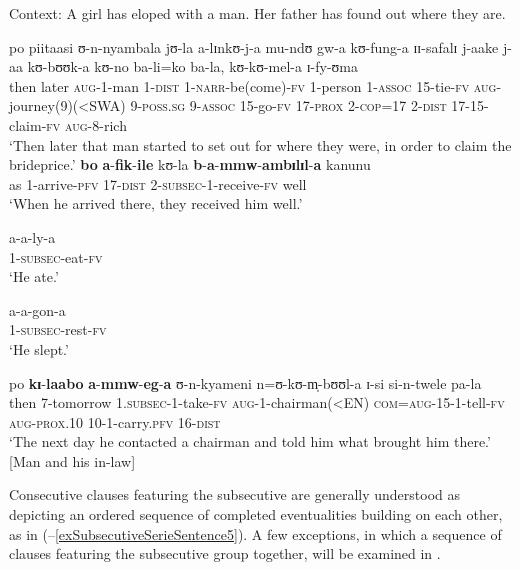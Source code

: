 \begin{exe}
\ex Context: A girl has eloped with a man. Her father has found out where they are.
\begin{xlist}
\ex \label{exSubsecutiveSerieSentence1} \gll po piitaasi ʊ-n-nyambala jʊ-la a-lɪnkʊ-j-a mu-ndʊ gw-a kʊ-fung-a ɪɪ-safalɪ j-aake j-aa kʊ-bʊʊk-a kʊ-no ba-li=ko ba-la, kʊ-kʊ-mel-a ɪ-fy-ʊma\\
then later \textsc{aug}-1-man 1-\textsc{dist} 1-\textsc{narr}-be(come)-\textsc{fv} 1-person 1-\textsc{assoc} 15-tie-\textsc{fv} \textsc{aug}-journey(9)(<SWA) 9-\textsc{poss.sg} 9-\textsc{assoc} 15-go-\textsc{fv} 17-\textsc{prox} 2-\textsc{cop}=17 2-\textsc{dist} 17-15-claim-\textsc{fv} \textsc{aug}-8-rich\\
\glt \lq Then later that man started to set out for where they were, in order to claim the brideprice.'
\ex \label{exSubsecutiveSerieSentence2}\gll \textbf{bo} \textbf{a}-\textbf{fik}-\textbf{ile} kʊ-la \textbf{b}-\textbf{a}-\textbf{mmw}-\textbf{ambɪlɪl}-\textbf{a} kanunu\\
as 1-arrive-\textsc{pfv} 17-\textsc{dist} 2-\textsc{subsec}-1-receive-\textsc{fv} well\\
\glt \lq When he arrived there, they received him well.'

\ex \gll a-a-ly-a\\
1-\textsc{subsec}-eat-\textsc{fv}\\
\glt \lq He ate.'

\ex \gll a-a-gon-a\\
1-\textsc{subsec}-rest-\textsc{fv}\\
\glt \lq He slept.'

\ex \label{exSubsecutiveSerieSentence5} \gll po \textbf{kɪ}-\textbf{laabo} \textbf{a}-\textbf{mmw}-\textbf{eg}-\textbf{a} ʊ-n-kyameni n=ʊ-kʊ-m̩-bʊʊl-a ɪ-si si-n-twele pa-la\\
then 7-tomorrow 1.\textsc{subsec}-1-take-\textsc{fv} \textsc{aug}-1-chairman(<EN) \textsc{com}=\textsc{aug}-15-1-tell-\textsc{fv} \textsc{aug}-\textsc{prox.10} 10-1-carry.\textsc{pfv} 16-\textsc{dist}\\
\glt \lq The next day he contacted  a chairman and told him what brought him there.' [Man and his in-law]

\end{xlist}
\end{exe}

Consecutive clauses featuring the subsecutive are generally understood as depicting an ordered sequence of completed eventualities building on each other, as in (--\ref{exSubsecutiveSerieSentence5}). A few exceptions, in which a sequence of clauses featuring the subsecutive group together, will be examined in .

